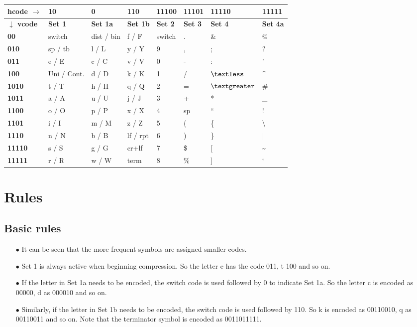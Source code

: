 \documentclass[]{article}
\begin{document}
\begin{center}
	\begin{tabular}{ | l | l | l | l | l | l | l | l | } \hline
		\textbf{hcode $\rightarrow$} & \textbf{10} & \textbf{0} & \textbf{110} & \textbf{11100} & \textbf{11101} & \textbf{11110} & \textbf{11111} \\ \hline
		\textbf{$\downarrow$ vcode} & \textbf{Set 1} & \textbf{Set 1a} & \textbf{Set 1b} & \textbf{Set 2} & \textbf{Set 3} & \textbf{Set 4} & \textbf{Set 4a} \\ \hline
		\textbf{00} & switch & dist / bin & f / F & switch & . & \& & @ \\ \hline
		\textbf{010} & sp / tb & l / L & y / Y & 9 & , & ; & ? \\ \hline
		\textbf{011} & e / E & c / C & v / V & 0 & - & : & ' \\ \hline
		\textbf{100} & Uni / Cont. & d / D & k / K & 1 & / & $\textless$ & \^{} \\ \hline
		\textbf{1010} & t / T & h / H & q / Q & 2 & = & $\textgreater$ & \# \\ \hline
		\textbf{1011} & a / A & u / U & j / J & 3 & + & * & \_ \\ \hline
		\textbf{1100} & o / O & p / P & x / X & 4 & sp & \textquotedblleft & ! \\ \hline
		\textbf{1101} & i / I & m / M & z / Z & 5 & ( & \{ & \textbackslash \\ \hline
		\textbf{1110} & n / N & b / B & lf / rpt & 6 & ) & \} & $|$ \\ \hline
		\textbf{11110} & s / S & g / G & cr+lf & 7 & \$ & [ & \~{} \\ \hline
		\textbf{11111} & r / R & w / W & term & 8 & \% & ] & ` \\ \hline
	\end{tabular}
\end{center}

\section{Rules}

\subsection{Basic rules}
\begin{itemize}
	\item[$\bullet$] It can be seen that the more frequent symbols are assigned smaller codes.
	\item[$\bullet$] Set 1 is always active when beginning compression.  So the letter e has the code 011, t 100 and so on.
	\item[$\bullet$] If the letter in Set 1a needs to be encoded, the switch code is used followed by 0 to indicate Set 1a.  So the letter c is encoded as 00000, d as 000010 and so on.
	\item[$\bullet$] Similarly, if the letter in Set 1b needs to be encoded, the switch code is used followed by 110. So k is encoded as 00110010, q as 00110011 and so on. Note that the terminator symbol is encoded as 0011011111.
\end{itemize}
\end{document}
